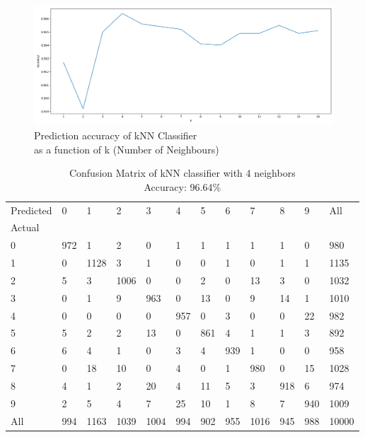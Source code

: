 \lipsum[1-1]

\begin{figure}[H]
    \centering
    \includegraphics[width=\textwidth]{images/knn.png}
    \caption*{Prediction accuracy of kNN Classifier \\
    as a function of k (Number of Neighbours)}
    \setlength{\belowcaptionskip}{-20pt}
    \setlength{\abovecaptionskip}{-20pt}
\end{figure}



\begin{table}[H]
    \centering
    \begin{tabular}{llllllllllll}
        Predicted & 0 & 1  & 2 & 3  & 4  & 5 & 6  & 7  & 8 & 9  & All \\
        Actual \\
        0      & 972 & 1    & 2    & 0    & 1   & 1   & 1   & 1    & 1   & 0   & 980   \\
        1      & 0   & 1128 & 3    & 1    & 0   & 0   & 1   & 0    & 1   & 1   & 1135  \\
        2      & 5   & 3    & 1006 & 0    & 0   & 2   & 0   & 13   & 3   & 0   & 1032  \\
        3      & 0   & 1    & 9    & 963  & 0   & 13  & 0   & 9    & 14  & 1   & 1010  \\
        4      & 0   & 0    & 0    & 0    & 957 & 0   & 3   & 0    & 0   & 22  & 982   \\
        5      & 5   & 2    & 2    & 13   & 0   & 861 & 4   & 1    & 1   & 3   & 892   \\
        6      & 6   & 4    & 1    & 0    & 3   & 4   & 939 & 1    & 0   & 0   & 958   \\
        7      & 0   & 18   & 10   & 0    & 4   & 0   & 1   & 980  & 0   & 15  & 1028  \\
        8      & 4   & 1    & 2    & 20   & 4   & 11  & 5   & 3    & 918 & 6   & 974   \\
        9      & 2   & 5    & 4    & 7    & 25  & 10  & 1   & 8    & 7   & 940 & 1009  \\
        All    & 994 & 1163 & 1039 & 1004 & 994 & 902 & 955 & 1016 & 945 & 988 & 10000
    \end{tabular}
    \caption*{Confusion Matrix of kNN classifier with 4 neighbors\\
    Accuracy: 96.64\%}
\end{table}

